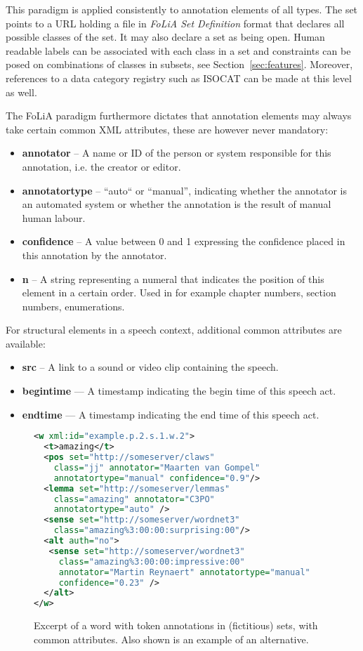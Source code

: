 \documentclass[a4paper,10pt,twoside]{article}
\begin{document}
This paradigm is applied consistently to annotation elements of all types. The
set points to a URL holding a file in \emph{FoLiA Set Definition} format that
declares all possible classes of the set. It may also declare a set as being
open. Human readable labels can be associated with each class in a set and
constraints can be posed on combinations of classes in subsets, see
Section~\ref{sec:features}. Moreover, references to a data category registry
such as ISOCAT \cite{ISOCAT} can be made at this level as well.

The FoLiA paradigm furthermore dictates that annotation elements may always take certain
common XML attributes, these are however never mandatory:

\begin{itemize}
\item \textbf{annotator} -- A name or ID of the person or system responsible for this annotation, i.e. the creator or editor.
\item \textbf{annotatortype} -- ``auto`` or ``manual'', indicating whether the annotator is an automated system or whether the annotation is the result of manual human labour.
\item \textbf{confidence} -- A value between 0 and 1 expressing the confidence placed in this annotation by the annotator.
\item \textbf{n} -- A string representing a numeral that indicates the position of this element in a certain order. Used in for example chapter numbers, section numbers, enumerations.
\end{itemize}

For structural elements in a speech context, additional common attributes are
available:

\begin{itemize}
  \item \textbf{src} -- A link to a sound or video clip containing the speech.
  \item \textbf{begintime} --- A timestamp indicating the begin time of this speech act.
  \item \textbf{endtime} --- A timestamp indicating the end time of this speech act.
\end{itemize}

\begin{figure}[tbh]
\begin{lstlisting}[language=xml]
<w xml:id="example.p.2.s.1.w.2">
  <t>amazing</t>
  <pos set="http://someserver/claws" 
    class="jj" annotator="Maarten van Gompel"
    annotatortype="manual" confidence="0.9"/>
  <lemma set="http://someserver/lemmas"
    class="amazing" annotator="C3PO" 
    annotatortype="auto" />
  <sense set="http://someserver/wordnet3"
    class="amazing%3:00:00:surprising:00"/>
  <alt auth="no">
   <sense set="http://someserver/wordnet3"
     class="amazing%3:00:00:impressive:00"
     annotator="Martin Reynaert" annotatortype="manual"
     confidence="0.23" />
  </alt>
</w> 
\end{lstlisting}
\caption{Excerpt of a word with token annotations in (fictitious) sets, with common attributes. Also shown is an example of an alternative.\label{fig:wordannotation}} 
\end{figure}
\end{document}

